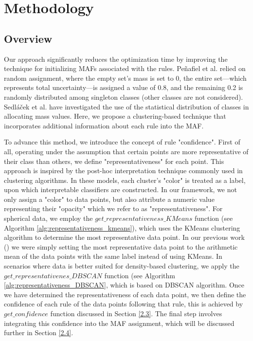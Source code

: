 \documentclass[10pt,a4paper,oneside]{article}
\begin{document}
\section{Methodology}\label{1.2}
\subsection{Overview}\label{1.2.2}
Our approach significantly reduces the optimization time by improving the technique for initializing MAFs associated with the rules. Peñafiel et al. \cite{sergio} relied on random assignment, where the empty set's mass is set to 0, the entire set—which represents total uncertainty—is assigned a value of 0.8, and the remaining 0.2 is randomly distributed among singleton classes (other classes are not considered). {\color{black} Sedláček et al. \cite{czechs} have investigated the use of the statistical distribution of classes in allocating mass values}. Here{\color{black},} we propose a {\color{black} clustering-based} technique that incorporates additional information about each rule into the MAF. 

To advance this method, we introduce the concept of rule "confidence". First of all, operating under the assumption that certain points are more representative of their class than others{\color{black},} we define "representativeness" for each point. This approach is inspired by the post-hoc interpretation technique commonly used in clustering algorithms. In these models, each cluster's "color" is treated as a label, upon which interpretable classifiers are constructed. In our framework, we not only assign a "color" to data points{\color{black},} but also attribute a numeric value representing their "opacity" which we refer to as "representativeness". For spherical data, we employ the $get\_representativeness\_KMeans$ function (see Algorithm \ref{alg:representativeness_kmeans}), which uses the KMeans clustering algorithm \cite{kmeans} to determine the most representative data point. {\color{black}In our previous work (\cite{menq}) we were simply setting the most representative data point to the arithmetic mean of the data points with the same label instead of using KMeans.} In scenarios where data is better suited for density-based clustering, we apply the $get\_representativenes\_DBSCAN$ function (see Algorithm \ref{alg:representativeness_DBSCAN}, {\color{black}which is based on DBSCAN \cite{DBSCAN} algorithm.} Once we have determined the representativeness of each data point, we then define the confidence of each rule of the data points following that rule, this is achieved by $get\_confidence$ function discussed in Section \ref{2.3}. The final step involves integrating this confidence into the MAF assignment, which will be discussed further in Section \ref{2.4}.
\end{document}

